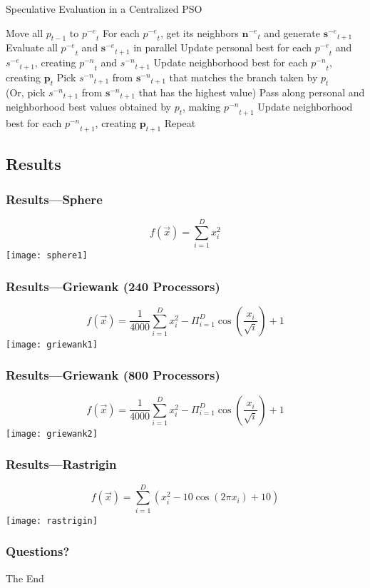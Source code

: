 \documentclass{beamer}
\providecommand{\noeval}[1]{\ensuremath{#1^{-e}}}
\providecommand{\nonbest}[1]{\ensuremath{#1^{-n}}}
\providecommand{\p}{\ensuremath{p}}
\providecommand{\pset}{\ensuremath{\mathbf{p}}}
\providecommand{\s}{\ensuremath{s}}
\providecommand{\sset}{\ensuremath{\mathbf{s}}}
\providecommand{\nset}{\ensuremath{\mathbf{n}}}
\begin{document}
\begin{frame}
  \begin{center}
\begin{algorithm}[H]
  \caption{Speculative Evaluation in a Centralized PSO}
  \label{alg:centralized}
  \begin{algorithmic}[1]
	\STATE Move all $\p_{t-1}$ to $\noeval{\p}_t$
	\STATE For each $\noeval{\p}_t$, get its neighbors $\noeval{\nset}_t$ and
	  generate $\noeval{\sset}_{t+1}$
	\STATE Evaluate all $\noeval{\p}_t$ and $\noeval{\sset}_{t+1}$ in parallel
	\STATE Update personal best for each $\noeval{\p}_t$ and
	  $\noeval{\s}_{t+1}$, creating $\nonbest{\p}_t$ and $\nonbest{\s}_{t+1}$
	\STATE Update neighborhood best for each $\nonbest{\p}_t$, creating
	  $\pset_t$
	\FORALL{$\p_t$}
	\STATE Pick $\nonbest{\s}_{t+1}$ from $\nonbest{\sset}_{t+1}$ that matches
	the branch taken by $\p_t$ \\ (Or, pick $\nonbest{\s}_{t+1}$ from
	$\nonbest{\sset}_{t+1}$ that has the highest value)
	\STATE Pass along personal and neighborhood best values obtained by $\p_t$,
	  making $\nonbest{\p}_{t+1}$
	\ENDFOR
	\STATE Update neighborhood best for each $\nonbest{\p}_{t+1}$, creating
	  $\pset_{t+1}$
	\STATE Repeat
  \end{algorithmic}
\end{algorithm}
  \end{center}
\end{frame}

\subsection{Results}
\begin{frame}
  \begin{center}
	\frametitle{Results---Sphere}
	\[f(\Vec{x}) = \sum_{i=1}^D x_i^2\]
	\texttt{[image: sphere1]}
  \end{center}
\end{frame}
\begin{frame}
  \begin{center}
	\frametitle{Results---Griewank (240 Processors)}
	\[f(\Vec{x}) = \frac{1}{4000} \sum_{i=1}^D x_i^2 - \Pi_{i=1}^D
	\cos\left(\frac{x_i}{\sqrt{i}}\right) + 1\]
	\texttt{[image: griewank1]}
  \end{center}
\end{frame}
\begin{frame}
  \begin{center}
	\frametitle{Results---Griewank (800 Processors)}
	\[f(\Vec{x}) = \frac{1}{4000} \sum_{i=1}^D x_i^2 - \Pi_{i=1}^D
	\cos\left(\frac{x_i}{\sqrt{i}}\right) + 1\]
	\texttt{[image: griewank2]}
  \end{center}
\end{frame}
\begin{frame}
  \begin{center}
	\frametitle{Results---Rastrigin}
	\[f(\Vec{x}) = \sum_{i=1}^D \left(x_i^2 - 10\cos\left(2\pi x_i\right) +
	10\right)\]
	\texttt{[image: rastrigin]}
  \end{center}
\end{frame}

\begin{frame}
  \frametitle{Questions?}
  \begin{center}
	\Huge \textrm{The End}
  \end{center}
\end{frame}
\end{document}
